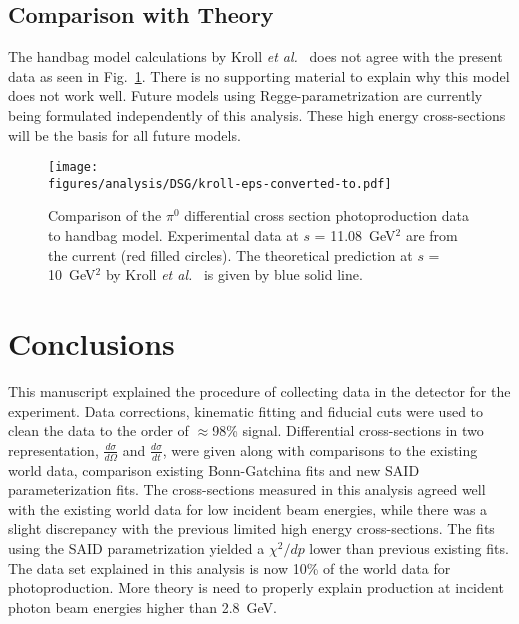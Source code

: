 \subsection{Comparison with Theory}\label{Kroll}
The handbag model calculations by Kroll \textit{et al.}~\cite{Huang2000} does not agree with the present data as seen in Fig.~\ref{fig:kroll}. There is no supporting material to explain why this model does not work well. Future models using Regge-parametrization are currently being formulated independently of this analysis. These high energy \piz cross-sections will be the basis for all future models.
\begin{figure}[h!]\begin{center}
\texttt{[image: \\figures/analysis/DSG/kroll-eps-converted-to.pdf]}
\caption[Comparison of the $\pi^0$ differential cross section  photoproduction data to  handbag model]{\label{fig:kroll}Comparison of the $\pi^0$ differential cross section  photoproduction data to  handbag model. Experimental data at $s$ = 11.08~GeV$^2$ are from the current (red filled circles). The theoretical prediction at $s$ = 10~GeV$^2$ by Kroll \textit{et al.}~\protect\cite{Huang2000} is given by blue solid line.}
\end{center}\end{figure} 
\FloatBarrier

\section{Conclusions}
This manuscript explained the procedure of collecting data in the  detector for the  experiment. Data corrections, kinematic fitting and fiducial cuts were used to clean the data to the order of $\approx$98\% signal. Differential cross-sections in two representation, $\frac{d\sigma}{d\Omega}$ and $\frac{d\sigma}{dt}$, were given along with comparisons to the existing world data, comparison existing Bonn-Gatchina fits and new SAID parameterization fits. The cross-sections measured in this analysis agreed well with the existing world data for low incident beam energies, while there was a slight discrepancy with the previous limited high energy cross-sections. The fits using the SAID parametrization yielded a $\chi^2/dp$ lower than previous existing fits. The data set explained in this analysis is now 10\% of the world data for \piz photoproduction. More theory is need to properly explain \piz production at incident photon beam energies higher than 2.8~GeV.





 